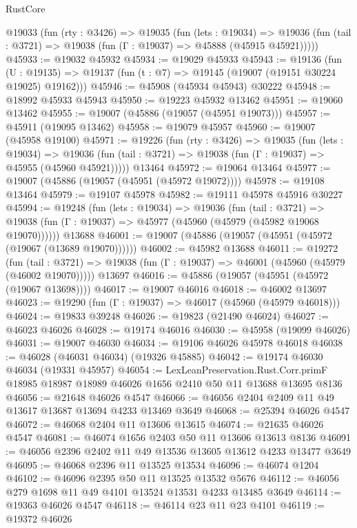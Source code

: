 \begin{lexlean}{RustCore}
\begin{coremodule}
  @19033
    (fun (rty : @3426) =>
    @19035
      (fun (lets : @19034) =>
      @19036 (fun (tail : @3721) => @19038 (fun (Γ : @19037) => @45888 (@45915 @45921)))))
@45933 := @19032 @45932
@45934 := @19029 @45933
@45943 := @19136
    (fun (U : @19135) => @19137 (fun (t : @7) => @19145 (@19007 (@19151 @30224 @19025) @19162)))
@45946 := @45908 (@45934 @45943) @30222
@45948 := @18992 @45933 @45943
@45950 := @19223 @45932 @13462
@45951 := @19060 @13462
@45955 := @19007 (@45886 (@19057 (@45951 @19073)))
@45957 := @45911 (@19095 @13462)
@45958 := @19079 @45957
@45960 := @19007 (@45958 @19100)
@45971 := @19226
    (fun (rty : @3426) =>
    @19035
      (fun (lets : @19034) =>
      @19036 (fun (tail : @3721) => @19038 (fun (Γ : @19037) => @45955 (@45960 @45921)))))
    @13464
@45972 := @19064 @13464
@45977 := @19007 (@45886 (@19057 (@45951 (@45972 @19072))))
@45978 := @19108 @13464
@45979 := @19107 @45978
@45982 := @19111 @45978 @45916 @30227
@45994 := @19248
    (fun (lets : @19034) =>
    @19036
      (fun (tail : @3721) =>
      @19038 (fun (Γ : @19037) => @45977 (@45960 (@45979 (@45982 @19068 @19070))))))
    @13688
@46001 := @19007 (@45886 (@19057 (@45951 (@45972 (@19067 (@13689 @19070))))))
@46002 := @45982 @13688
@46011 := @19272
    (fun (tail : @3721) => @19038 (fun (Γ : @19037) => @46001 (@45960 (@45979 (@46002 @19070)))))
    @13697
@46016 := @45886 (@19057 (@45951 (@45972 (@19067 @13698))))
@46017 := @19007 @46016
@46018 := @46002 @13697
@46023 := @19290 (fun (Γ : @19037) => @46017 (@45960 (@45979 @46018)))
@46024 := @19833 @39248
@46026 := @19823 (@21490 @46024)
@46027 := @46023 @46026
@46028 := @19174 @46016
@46030 := @45958 (@19099 @46026)
@46031 := @19007 @46030
@46034 := @19106 @46026 @45978 @46018
@46038 := @46028 (@46031 @46034) (@19326 @45885)
@46042 := @19174 @46030 @46034 (@19331 @45957)
@46054 := LexLeanPreservation.Rust.Corr.primF
    @18985
    @18987
    @18989
    @46026
    @1656
    @2410
    @50
    @11
    @13688
    @13695
    @8136
@46056 := @21648 @46026 @4547
@46066 := @46056 @2404 @2409 @11 @49 @13617 @13687 @13694 @4233 @13469 @3649
@46068 := @25394 @46026 @4547
@46072 := @46068 @2404 @11 @13606 @13615
@46074 := @21635 @46026 @4547
@46081 := @46074 @1656 @2403 @50 @11 @13606 @13613 @8136
@46091 := @46056 @2396 @2402 @11 @49 @13536 @13605 @13612 @4233 @13477 @3649
@46095 := @46068 @2396 @11 @13525 @13534
@46096 := @46074 @1204
@46102 := @46096 @2395 @50 @11 @13525 @13532 @5676
@46112 := @46056 @279 @1698 @11 @49 @4101 @13524 @13531 @4233 @13485 @3649
@46114 := @19363 @46026 @4547
@46118 := @46114 @23 @11 @23 @4101
@46119 := @19372 @46026

\end{coremodule}
\end{lexlean}
